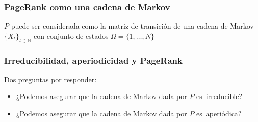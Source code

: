 \begin{frame}
\frametitle{PageRank como una cadena de Markov}

{\small

$P$ puede ser considerada como la matriz de transición de una cadena de Markov $\{ X_t \}_{t \in \mathbb{N}}$ con conjunto de estados $\Omega = \{1, \ldots, N\}$
\begin{itemize}
\end{itemize}





}



\end{frame}

\begin{frame}
\frametitle{Irreducibilidad, aperiodicidad y PageRank}

{\small

Dos preguntas por responder:
\begin{itemize}
\item ¿Podemos asegurar que la cadena de Markov dada por $P$ es~irreducible? 
\item ¿Podemos asegurar que la cadena de Markov dada por $P$ es~aperiódica? 
\end{itemize}





}

\end{frame}

